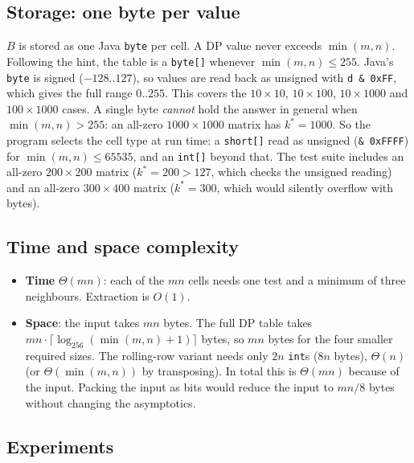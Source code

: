 \documentclass[11pt]{article}
\begin{document}
\subsection{Storage: one byte per value}
$B$ is stored as one Java \texttt{byte} per cell. A DP value never
exceeds $\min(m,n)$. Following the hint, the table is a \texttt{byte[]}
whenever $\min(m,n)\le255$. Java's \texttt{byte} is signed ($-128..127$), so
values are read back as unsigned with \texttt{d \& 0xFF}, which gives the full
range $0..255$. This covers the $10\times10$, $10\times100$,
$10\times1000$ and $100\times1000$ cases. A single byte \emph{cannot} hold the
answer in general when $\min(m,n)>255$: an all-zero $1000\times1000$ matrix has
$k^\ast=1000$. So the program selects the cell type at run time:
a \texttt{short[]} read as unsigned (\texttt{\& 0xFFFF}) for
$\min(m,n)\le65535$, and an \texttt{int[]} beyond that. The test suite
includes an all-zero $200\times200$ matrix ($k^\ast=200>127$, which checks the
unsigned reading) and an all-zero $300\times400$ matrix ($k^\ast=300$, which
would silently overflow with bytes).

\subsection{Time and space complexity}
\begin{itemize}
\item \textbf{Time} $\Theta(mn)$: each of the $mn$ cells needs one test and a
  minimum of three neighbours. Extraction is $O(1)$.
\item \textbf{Space}: the input takes $mn$ bytes. The full DP table takes
  $mn\cdot\lceil\log_{256}(\min(m,n)+1)\rceil$ bytes, so $mn$ bytes for the
  four smaller required sizes. The rolling-row variant needs only
  $2n$ \texttt{int}s ($8n$ bytes), $\Theta(n)$ (or $\Theta(\min(m,n))$ by transposing). In total
  this is $\Theta(mn)$ because of the input. Packing the input as bits would
  reduce the input to $mn/8$ bytes without changing the asymptotics.
\end{itemize}

\subsection{Experiments}
\end{document}
